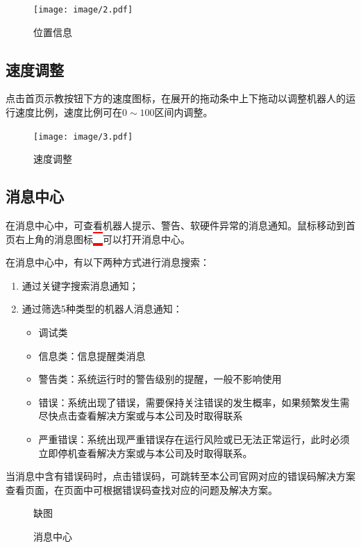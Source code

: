 \begin{figure}[ht]
	\centering
	\texttt{[image: image/2.pdf]}
	\caption{位置信息}
	\label{fig:位置信息}
\end{figure}

\subsection{速度调整}
点击\LM 首页示教按钮下方的速度图标，在展开的拖动条中上下拖动以调整机器人的运行速度比例，速度比例可在$0\sim 100$区间内调整。

\begin{figure}[ht]
	\centering
	\texttt{[image: image/3.pdf]}
	\caption{速度调整}
	\label{fig:速度调整}
\end{figure}

\subsection{消息中心}
在消息中心中，可查看机器人提示、警告、软硬件异常的消息通知。鼠标移动到\LM 首页右上角的消息图标\colorbox{red}{\includegraphics[height=1em]{image/22.pdf}}可以打开消息中心。

在消息中心中，有以下两种方式进行消息搜索：
\begin{enumerate}
	\item 通过关键字搜索消息通知；
	\item 通过筛选5种类型的机器人消息通知：
	\begin{itemize}
\item {} 调试类
\item {} 信息类：信息提醒类消息
\item {} 警告类：系统运行时的警告级别的提醒，一般不影响使用
\item {} 错误：系统出现了错误，需要保持关注错误的发生概率，如果频繁发生需尽快点击查看解决方案或与本公司及时取得联系
\item {} 严重错误：系统出现严重错误存在运行风险或已无法正常运行，此时必须立即停机查看解决方案或与本公司及时取得联系。
	\end{itemize}
\end{enumerate}

当消息中含有错误码时，点击错误码，可跳转至本公司官网对应的错误码解决方案查看页面，在页面中可根据错误码查找对应的问题及解决方案。

\begin{figure}[ht]
	\centering
	\color{red}缺图
	\caption{消息中心}
	\label{fig:消息中心}
\end{figure}

